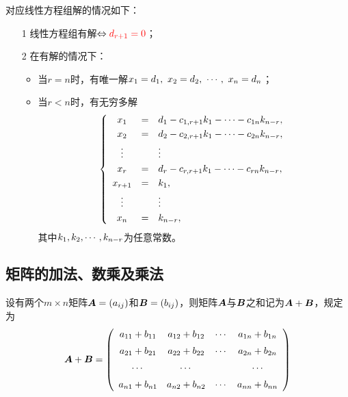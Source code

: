 \begin{frame}
对应线性方程组解的情况如下：   
\begin{itemize}
\item[1] 线性方程组有解$ \Leftrightarrow \textcolor{red}{d_{r+1}=0}$；\\[0.3cm]
\item[2] 在有解的情况下：
  \begin{itemize}
  \item 当$r=n$时，有唯一解$x_1=d_1,~x_2=d_2,~\cdots,~x_n=d_n$；
  \item 当$r<n$时，有无穷多解
    $$
    \left\{
      \begin{array}{ccl}
        x_1 &=& d_1 - c_{1,r+1}k_1 - \cdots - c_{1n}k_{n-r}, \\[0.1cm]
        x_2 &=& d_2 - c_{2,r+1}k_1 - \cdots - c_{2n}k_{n-r}, \\[0.1cm]
        \vdots & & \vdots \\[0.1cm]
        x_r &=& d_r - c_{r,r+1}k_1 - \cdots - c_{rn}k_{n-r}, \\[0.1cm]
        x_{r+1} &=& k_1, \\[0.1cm]
        \vdots && \vdots \\[0.1cm]
        x_{n} &=& k_{n-r},
      \end{array}
    \right.
    $$
    其中$k_1,k_2,\cdots,k_{n-r}$为任意常数。
  \end{itemize}
  \end{itemize}
\end{frame}

\subsection{矩阵的加法、数乘及乘法}

\begin{frame}
  \begin{dingyi}[矩阵的加法]
  设有两个$m\times n$矩阵$\boldsymbol{A}=(a_{ij})$和$\boldsymbol{B}=(b_{ij})$，则矩阵$\boldsymbol{A}$与$\boldsymbol{B}$之和记为$\boldsymbol{A}+\boldsymbol{B}$，规定为
  $$
  \boldsymbol{A} + \boldsymbol{B} = 
  \left(
    \begin{array}{cccc}
      a_{11} + b_{11}  & a_{12} + b_{12}  & \cdots & a_{1n} + b_{1n}  \\[0.2cm]
      a_{21} + b_{21}  & a_{22} + b_{22}  & \cdots & a_{2n} + b_{2n}  \\[0.2cm]
      \cdots            & \cdots            &     & \cdots            \\[0.2cm]
      a_{n1} + b_{n1}  & a_{n2} + b_{n2}  & \cdots & a_{nn} + b_{nn}  
    \end{array}
  \right)
  $$
\end{dingyi}

\begin{zhu*}
\end{zhu*}
\end{frame}

